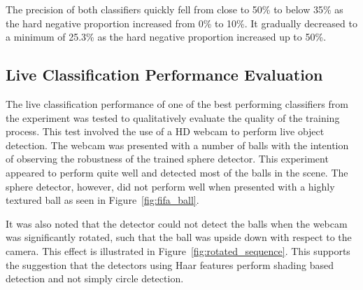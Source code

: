 \documentclass{sig-alternate-05-2015}
\begin{document}
{    The precision of both classifiers quickly fell from close to 50\% to below 35\% as the hard negative proportion increased from 0\% to 10\%. It gradually decreased to a minimum of 25.3\% as the hard negative proportion increased up to 50\%.

    \subsection{Live Classification Performance Evaluation} {
  		The live classification performance of one of the best performing classifiers from the experiment was tested to qualitatively evaluate the quality of the training process.
  		This test involved the use of a HD webcam to perform live object detection. The webcam was presented with a number of balls with the intention of observing the robustness of the trained sphere detector.
  		This experiment appeared to perform quite well and detected most of the balls in the scene. The sphere detector, however, did not perform well when presented with a highly textured ball as seen in Figure~\ref{fig:fifa_ball}.

  		It was also noted that the detector could not detect the balls when the webcam was significantly rotated, such that the ball was upside down with respect to the camera. This effect is illustrated in Figure~\ref{fig:rotated_sequence}. This supports the suggestion that the detectors using Haar features perform shading based detection and not simply circle detection.
    }




		\newcommand{\includesequence}[1]{\texttt{[image: images/rotation/\#1]}}

}
\end{document}

